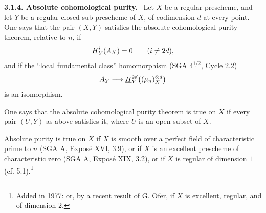 \documentclass[11pt]{article}
\theoremstyle{plain}
\theoremstyle{definition}
\theoremstyle{remark}
\newenvironment{statement}[1]{\par\medskip\noindent\textbf{#1.}\ }{\par\medskip}
\begin{document}
\begin{statement}{3.1.4. Absolute cohomological purity}
Let $X$ be a regular prescheme, and let $Y$ be a regular closed sub-prescheme of $X$, of codimension $d$ at every point. One says that the pair $(X,Y)$ satisfies the absolute cohomological purity theorem, relative to $n$, if
\[
   \underline{H}^i_Y(A_X)=0\qquad (i\ne 2d),
\]
and if the ``local fundamental class'' homomorphism (SGA $4^{1/2}$, Cycle 2.2)
\[
   A_Y\longrightarrow \underline{H}^{2d}_Y\bigl((\mu_n)^{\otimes d}_X\bigr)
\]
is an isomorphism.

One says that the absolute cohomological purity theorem is true on $X$ if every pair $(U,Y)$ as above satisfies it, where $U$ is an open subset of $X$.

Absolute purity is true on $X$ if $X$ is smooth over a perfect field of characteristic prime to $n$ (SGA A, Exposé XVI, 3.9), or if $X$ is an excellent prescheme of characteristic zero (SGA A, Exposé XIX, 3.2), or if $X$ is regular of dimension $1$ (cf. 5.1).\footnote{Added in 1977: or, by a recent result of G. Ofer, if $X$ is excellent, regular, and of dimension $2$.}
\end{statement}
\end{document}
